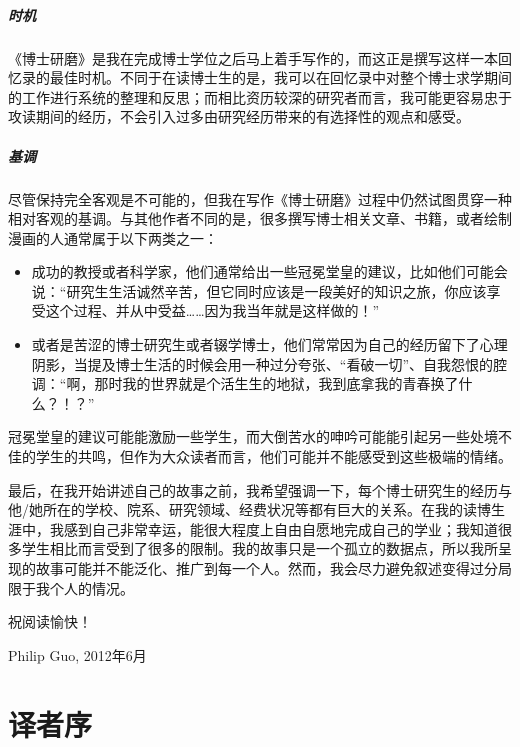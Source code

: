 \documentclass[letter,12pt]{book}
\newcommand{\bookname}{博士研磨}
\begin{document}
\begin{CJK}{UTF8}{gbsn}
\paragraph{时机} 《\bookname》是我在完成博士学位之后马上着手写作的，而这正是撰写这样一本回忆录的最佳时机。不同于在读博士生的是，我可以在回忆录中对整个博士求学期间的工作进行系统的整理和反思；而相比资历较深的研究者而言，我可能更容易忠于攻读期间的经历，不会引入过多由研究经历带来的有选择性的观点和感受。


\paragraph{基调} 尽管保持完全客观是不可能的，但我在写作《\bookname》过程中仍然试图贯穿一种相对客观的基调。与其他作者不同的是，很多撰写博士相关文章、书籍，或者绘制漫画的人通常属于以下两类之一：
\begin{itemize}
\item 成功的教授或者科学家，他们通常给出一些冠冕堂皇的建议，比如他们可能会说：“研究生生活诚然辛苦，但它同时应该是一段美好的知识之旅，你应该享受这个过程、并从中受益……因为我当年就是这样做的！”
\item 或者是苦涩的博士研究生或者辍学博士，他们常常因为自己的经历留下了心理阴影，当提及博士生活的时候会用一种过分夸张、“看破一切”、自我怨恨的腔调：“啊，那时我的世界就是个活生生的地狱，我到底拿我的青春换了什么？！？”
\end{itemize}

冠冕堂皇的建议可能能激励一些学生，而大倒苦水的呻吟可能能引起另一些处境不佳的学生的共鸣，但作为大众读者而言，他们可能并不能感受到这些极端的情绪。

最后，在我开始讲述自己的故事之前，我希望强调一下，每个博士研究生的经历与他/她所在的学校、院系、研究领域、经费状况等都有巨大的关系。在我的读博生涯中，我感到自己非常幸运，能很大程度上自由自愿地完成自己的学业；我知道很多学生相比而言受到了很多的限制。我的故事只是一个孤立的数据点，所以我所呈现的故事可能并不能泛化、推广到每一个人。然而，我会尽力避免叙述变得过分局限于我个人的情况。

祝阅读愉快！

\begin{flushright}
Philip Guo, 2012年6月
\end{flushright}

\chapter*{译者序}
\markboth{}{}



\end{CJK}
\end{document}
